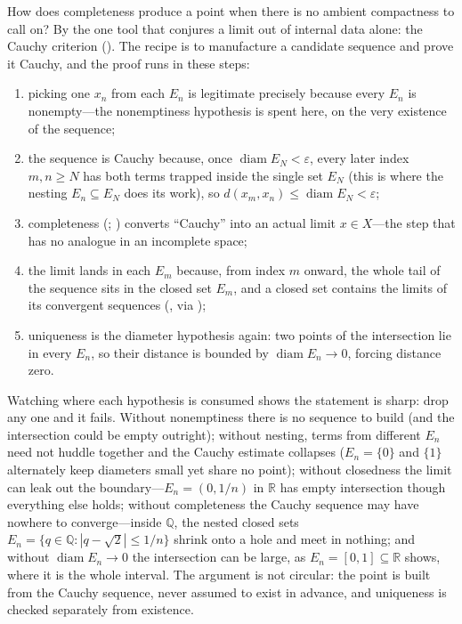 \documentclass[main.tex]{subfiles}
\begin{document}
\begin{Reflection}
How does completeness produce a point when there is no ambient compactness to call on? By the one tool
that conjures a limit out of internal data alone: the Cauchy criterion (). The recipe is
to manufacture a candidate sequence and prove it Cauchy, and the proof runs in these steps:
\begin{enumerate}[leftmargin=1.7em,itemsep=3pt,topsep=2pt,label=\textnormal{(\arabic*)}]
  \item picking one $x_n$ from each $E_n$ is legitimate precisely because every $E_n$ is nonempty---the
        nonemptiness hypothesis is spent here, on the very existence of the sequence;
  \item the sequence is Cauchy because, once $\operatorname{diam} E_N<\varepsilon$, every later index
        $m,n\ge N$ has both terms trapped inside the single set $E_N$ (this is where the nesting
        $E_n\subseteq E_N$ does its work), so $d(x_m,x_n)\le\operatorname{diam} E_N<\varepsilon$;
  \item completeness (; )
        converts ``Cauchy'' into an actual limit $x\in X$---the step that has no analogue in an
        incomplete space;
  \item the limit lands in each $E_m$ because, from index $m$ onward, the whole tail of the sequence
        sits in the closed set $E_m$, and a closed set contains the limits of its convergent sequences
        (, via );
  \item uniqueness is the diameter hypothesis again: two points of the intersection lie in every $E_n$,
        so their distance is bounded by $\operatorname{diam} E_n\to 0$, forcing distance zero.
\end{enumerate}

Watching where each hypothesis is consumed shows the statement is sharp: drop any one and it fails.
Without nonemptiness there is no sequence to build (and the intersection could be empty outright);
without nesting, terms from different $E_n$ need not huddle together and the Cauchy estimate collapses
($E_n=\{0\}$ and $\{1\}$ alternately keep diameters small yet share no point); without closedness the
limit can leak out the boundary---$E_n=(0,1/n)$ in $\mathbb R$ has empty intersection though everything
else holds; without completeness the Cauchy sequence may have nowhere to converge---inside $\mathbb Q$,
the nested closed sets $E_n=\{q\in\mathbb Q:|q-\sqrt2|\le 1/n\}$ shrink onto a hole and meet in
nothing; and without $\operatorname{diam} E_n\to 0$ the intersection can be large, as
$E_n=[0,1]\subseteq\mathbb R$ shows, where it is the whole interval. The argument is not circular: the
point is built from the Cauchy sequence, never assumed to exist in advance, and uniqueness is checked
separately from existence.


\end{Reflection}
\end{document}
